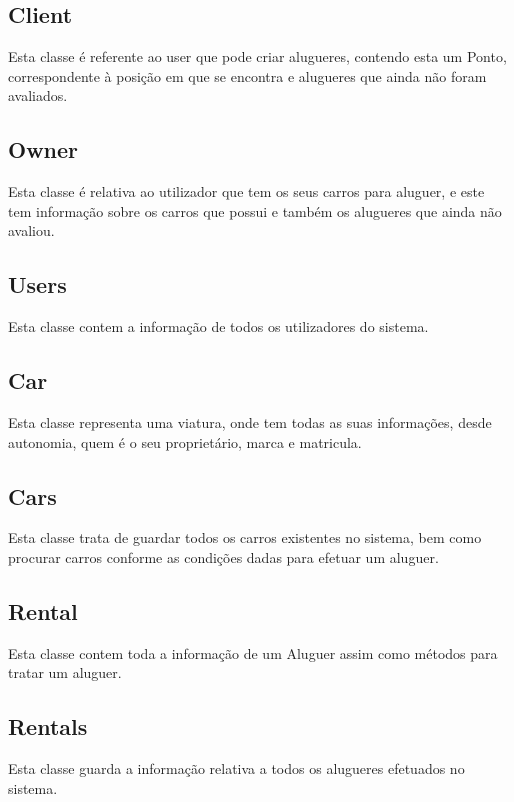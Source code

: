 \documentclass[a4paper]{report}
\begin{document}
\subsection{Client}

Esta classe é referente ao user que pode criar alugueres, contendo
esta um Ponto, correspondente à posição em que se encontra e alugueres
que ainda não foram avaliados.

\subsection{Owner}

Esta classe é relativa ao utilizador que tem os seus carros para aluguer,
e este tem informação sobre os carros que possui e também os alugueres
que ainda não avaliou.

\subsection{Users}

Esta classe contem a informação de todos os utilizadores do sistema.

\subsection{Car}\label{chap:car}

Esta classe representa uma viatura, onde tem todas as suas informações,
desde autonomia, quem é o seu proprietário, marca e matricula.

\subsection{Cars}

Esta classe trata de guardar todos os carros existentes no sistema, bem
como procurar carros conforme as condições dadas para efetuar um aluguer.

\subsection{Rental}

Esta classe contem toda a informação de um Aluguer assim como métodos para tratar
um aluguer.

\subsection{Rentals}

Esta classe guarda a informação relativa a todos os alugueres efetuados
no sistema.
\end{document}
